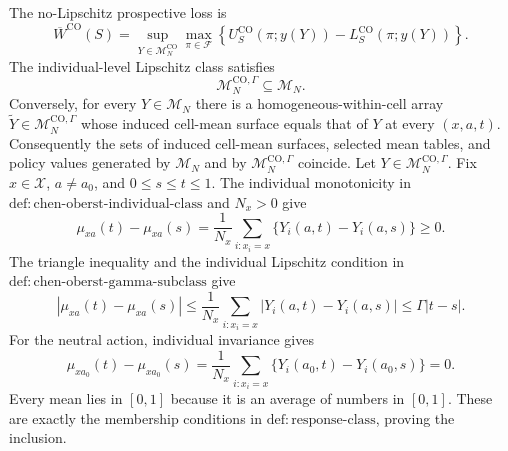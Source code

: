 The no-Lipschitz prospective loss is
\[
\overline W^{\mathrm{CO}}(S)
=\sup_{Y\in\mathcal M_N^{\mathrm{CO}}}
\max_{\pi\in\mathcal F}
\left\{U^{\mathrm{CO}}_S(\pi;y(Y))-L^{\mathrm{CO}}_S(\pi;y(Y))\right\}.
\]
The individual-level Lipschitz class satisfies
\[
\mathcal M_N^{\mathrm{CO},\Gamma}\subseteq\mathcal M_N.
\]
Conversely, for every \(Y\in\mathcal M_N\) there is a homogeneous-within-cell array \(\widetilde Y\in\mathcal M_N^{\mathrm{CO},\Gamma}\) whose induced cell-mean surface equals that of \(Y\) at every \((x,a,t)\).  Consequently the sets of induced cell-mean surfaces, selected mean tables, and policy values generated by \(\mathcal M_N\) and by \(\mathcal M_N^{\mathrm{CO},\Gamma}\) coincide.
Let \(Y\in\mathcal M_N^{\mathrm{CO},\Gamma}\).  Fix \(x\in\mathcal X\), \(a\neq a_0\), and \(0\leq s\leq t\leq1\).  The individual monotonicity in \(\mathrm{def{:}chen\text{-}oberst\text{-}individual\text{-}class}\) and \(N_x>0\) give
\[
\mu_{xa}(t)-\mu_{xa}(s)
=\frac1{N_x}\sum_{i:x_i=x}\{Y_i(a,t)-Y_i(a,s)\}\geq0.
\]
The triangle inequality and the individual Lipschitz condition in \(\mathrm{def{:}chen\text{-}oberst\text{-}gamma\text{-}subclass}\) give
\[
|\mu_{xa}(t)-\mu_{xa}(s)|
\leq\frac1{N_x}\sum_{i:x_i=x}|Y_i(a,t)-Y_i(a,s)|
\leq\Gamma|t-s|.
\]
For the neutral action, individual invariance gives
\[
\mu_{x a_0}(t)-\mu_{x a_0}(s)
=\frac1{N_x}\sum_{i:x_i=x}\{Y_i(a_0,t)-Y_i(a_0,s)\}=0.
\]
Every mean lies in \([0,1]\) because it is an average of numbers in \([0,1]\).  These are exactly the membership conditions in \(\mathrm{def{:}response\text{-}class}\), proving the inclusion.

